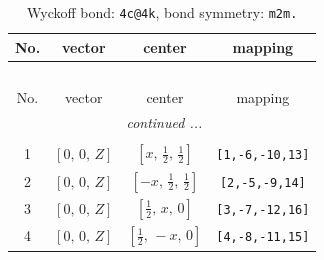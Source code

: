 \documentclass[fleqn,8pt]{jsarticle}
\begin{document}
\renewcommand{\arraystretch}{1.2}
\begin{longtable}{cccc}
\caption{Wyckoff bond: {\tt 4c@4k}, bond symmetry: {\tt m2m.}}
 \\
 \hline \hline
No. & vector & center & mapping \\ \hline \endfirsthead

\multicolumn{3}{l}{\tablename\ \thetable{}} \\
 \hline \hline
No. & vector & center & mapping \\ \hline \endhead

 \hline \hline
\multicolumn{3}{r}{\footnotesize\it continued ...} \\ \endfoot

 \hline \hline
\multicolumn{3}{r}{} \\ \endlastfoot

1 & $\left[ 0,\, 0,\, Z \right]$ & $\left[ x,\, \frac{1}{2},\, \frac{1}{2} \right]$ & {\tt [1,-6,-10,13]} \\ \hline
2 & $\left[ 0,\, 0,\, Z \right]$ & $\left[ - x,\, \frac{1}{2},\, \frac{1}{2} \right]$ & {\tt [2,-5,-9,14]} \\ \hline
3 & $\left[ 0,\, 0,\, Z \right]$ & $\left[ \frac{1}{2},\, x,\, 0 \right]$ & {\tt [3,-7,-12,16]} \\ \hline
4 & $\left[ 0,\, 0,\, Z \right]$ & $\left[ \frac{1}{2},\, - x,\, 0 \right]$ & {\tt [4,-8,-11,15]} \\
\end{longtable}
\renewcommand{\arraystretch}{1.2}
\end{document}
